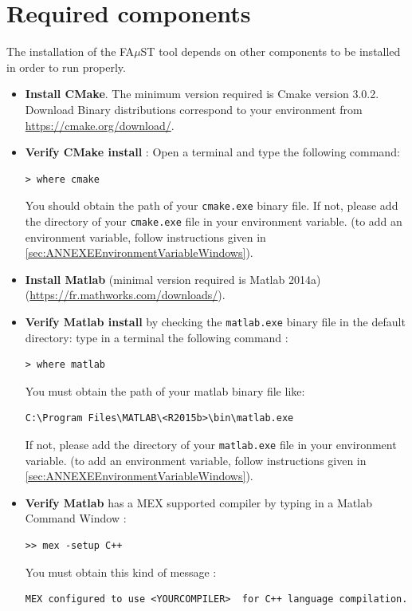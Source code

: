 \section{Required components}\label{sec:WinRequired}
The installation of the FA$\mu$ST tool depends on other components to be installed in order to run properly. 

\begin{itemize}
\item \textbf{Install CMake}. The minimum version required is Cmake version 3.0.2. Download Binary distributions correspond to your environment from \url{https://cmake.org/download/}.
\item \textbf{Verify CMake install} : Open a terminal and type the following command:
\begin{lstlisting}
> where cmake
\end{lstlisting}
You should obtain the path of your \texttt{cmake.exe} binary file. If not, please add the directory of your \texttt{cmake.exe} file in your environment variable. (to add an environment variable, follow instructions given in \ref{sec:ANNEXEEnvironmentVariableWindows}). 

\item \textbf{Install Matlab} (minimal version required is Matlab 2014a) (\url{https://fr.mathworks.com/downloads/}). 

\item \textbf{Verify Matlab install} by checking the \texttt{matlab.exe} binary file in the default directory:  type in a terminal the following command : 
\begin{lstlisting}
> where matlab
\end{lstlisting}
You must obtain the path of your matlab binary file like: 
\begin{lstlisting}[backgroundcolor=\color{white}]
C:\Program Files\MATLAB\<R2015b>\bin\matlab.exe
\end{lstlisting}
If not, please add the directory of your \texttt{matlab.exe} file in your environment variable. (to add an environment variable, follow instructions given in \ref{sec:ANNEXEEnvironmentVariableWindows}). \\

\item \textbf{Verify Matlab} has a MEX supported compiler by typing in a Matlab Command Window :
\begin{lstlisting}
>> mex -setup C++
\end{lstlisting}

You must obtain this kind of message :
\begin{lstlisting}[backgroundcolor=\color{white},keywordstyle=\color{black}]
MEX configured to use <YOURCOMPILER>  for C++ language compilation.
\end{lstlisting}


\end{itemize}
